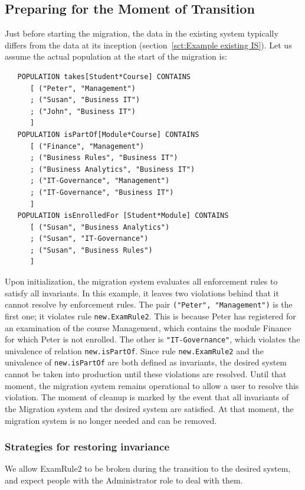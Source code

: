 \documentclass{elsarticle}
\begin{document}
\subsection{Preparing for the Moment of Transition}
   Just before starting the migration,
   the data in the existing system typically differs from the data at its inception (section~\ref{sct:Example existing IS}).
   Let us assume the actual population at the start of the migration is:
\begin{verbatim}
   POPULATION takes[Student*Course] CONTAINS
      [ ("Peter", "Management")
      ; ("Susan", "Business IT")
      ; ("John", "Business IT")
      ]
   POPULATION isPartOf[Module*Course] CONTAINS
      [ ("Finance", "Management")
      ; ("Business Rules", "Business IT")
      ; ("Business Analytics", "Business IT")
      ; ("IT-Governance", "Management")
      ; ("IT-Governance", "Business IT")
      ]
   POPULATION isEnrolledFor [Student*Module] CONTAINS
      [ ("Susan", "Business Analytics")
      ; ("Susan", "IT-Governance")
      ; ("Susan", "Business Rules")
      ]
\end{verbatim}

   Upon initialization, the migration system evaluates all enforcement rules to satisfy all invariants.
   In this example, it leaves two violations behind that it cannot resolve by enforcement rules.
   The pair {\tt ("Peter", "Management")} is the first one; it violates rule {\tt new.ExamRule2}.
   This is because Peter has registered for an examination of the course Management,
   which contains the module Finance for which Peter is not enrolled.
   The other is {\tt "IT-Governance"}, which violates the univalence of relation {\tt new.isPartOf}.
   Since rule {\tt new.ExamRule2} and the univalence of {\tt new.isPartOf} are both defined as invariants,
   the desired system cannot be taken into production until these violations are resolved.
   Until that moment, the migration system remains operational to allow a user to resolve this violation. 
   The moment of cleanup is marked by the event that all invariants of the Migration system and the desired system are satisfied.
   At that moment, the migration system is no longer needed and can be removed.

\subsubsection{Strategies for restoring invariance}

We allow ExamRule2 to be broken during the transition to the desired system, and expect people with the Administrator role to deal with them.
\end{document}
